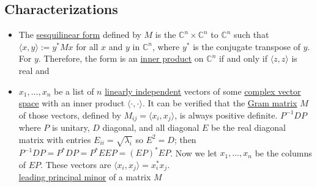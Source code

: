 {{{{{{{{{{\subsection{Characterizations}\label{characterizations}}
%
%
\begin{itemize}
\item[The associated sesquilinear form is an inner product:] The
\href{sesquilinear_form}{sesquilinear form} defined by \(M\) is the
\(\mathbb{C}^n \times \mathbb{C}^n\) to \(\mathbb{C}^n\) such that
\(\langle x, y \rangle := y^*M x\) for all \(x\) and \(y\) in
\(\mathbb{C}^n\), where \(y^*\) is the conjugate transpose of \(y\). For
\(y\). Therefore, the form is an \href{inner_product}{inner product} on
\(\mathbb{C}^n\) if and only if \(\langle z, z \rangle\) is real and
\item 
\(x_1, \ldots, x_n\) be a list of \(n\)
\href{linearly_independent}{linearly independent} vectors of some
\href{complex_vector_space}{complex vector space} with an inner product
\(\langle \cdot, \cdot \rangle\). It can be verified that the
\href{Gram_matrix}{Gram matrix} \(M\) of those vectors, defined by
\(M_{ij} = \langle x_i, x_j \rangle\), is always positive definite.
\(P^{-1} DP\) where \(P\) is unitary, \(D\) diagonal, and all diagonal
\(E\) be the real diagonal matrix with entries
\(E_{ii} = \sqrt{\lambda_i}\) so \(E^2 = D\); then
\(P^{-1}DP = P^*DP = P^*E EP = (EP)^* EP\). Now we let
\(x_1, \ldots, x_n\) be the columns of \(EP\). These vectors are
\(\langle x_i, x_j \rangle = x_i^\ast x_j\).\\
\href{minor_(linear_algebra)}{leading principal minor} of a matrix \(M\)

\end{itemize}}}}}}}}}}
